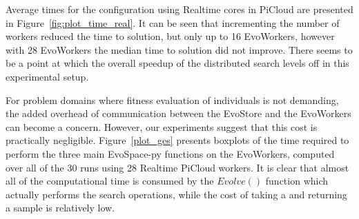 
Average times for the configuration using Realtime cores in PiCloud
are presented in Figure~\ref{fig:plot_time_real}. It can be seen that
incrementing the number of workers reduced the time to solution, but only up to 16 EvoWorkers,
however with 28 EvoWorkers the median time to solution did not improve.
There seems to be a point at which the overall speedup of the distributed search levels off in this experimental setup.

For problem domains where fitness evaluation of individuals is not demanding, the added overhead of communication between the EvoStore and the EvoWorkers
can become a concern.
However, our experiments suggest that this cost is practically negligible.
Figure~\ref{plot_ges} presents boxplots of the time required to perform the
three main EvoSpace-py functions on the EvoWorkers, computed over all of the 30 runs using 28 Realtime PiCloud workers.
It is clear that almost all of the computational time is consumed by the $Evolve()$ function which actually performs the search operations,
while the cost of taking a and returning a sample is relatively low.


